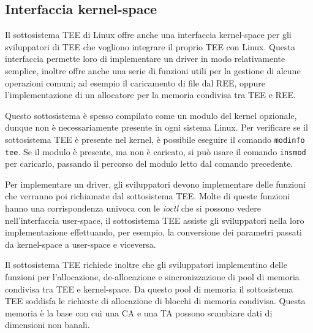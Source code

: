 \documentclass[12pt,italian]{report}
\begin{document}
\subsection{Interfaccia kernel-space}
\label{sec:interfaccia-kernel-space}
Il sottosistema TEE di Linux offre anche una interfaccia kernel-space per
gli sviluppatori di TEE che vogliono integrare il proprio TEE con Linux.
Questa interfaccia permette loro di implementare un driver in modo
relativamente semplice, inoltre offre anche una serie di funzioni
utili per la gestione di alcune operazioni comuni; ad esempio il caricamento
di file dal REE, oppure l'implementazione di un allocatore per la memoria
condivisa tra TEE e REE.

Questo sottosistema è spesso compilato come un modulo del kernel opzionale,
dunque non è necessariamente presente in ogni sistema Linux.
Per verificare se il sottosistema TEE è presente nel kernel, è possibile
eseguire il comando \texttt{modinfo tee}.
Se il modulo è presente, ma non è caricato, si può usare il comando
\texttt{insmod} per caricarlo, passando il percorso del modulo letto
dal comando precedente.

\bigbreak \noindent

Per implementare un driver, gli sviluppatori devono implementare
delle funzioni che verranno poi richiamate dal sottosistema TEE.
Molte di queste funzioni hanno una corrispondenza univoca con le
\textit{ioctl} che si possono vedere nell'interfaccia user-space,
il sottosistema TEE assiste gli sviluppatori nella loro
implementazione effettuando, per esempio, la conversione dei parametri
passati da kernel-space a user-space e viceversa.

Il sottosistema TEE richiede inoltre che gli sviluppatori
implementino delle funzioni per l'allocazione, de-allocazione e
sincronizzazione di pool di memoria condivisa tra TEE e kernel-space.
Da questo pool di memoria il sottosistema TEE soddisfa le richieste
di allocazione di blocchi di memoria condivisa.
Questa memoria è la base con cui una CA e una TA possono scambiare
dati di dimensioni non banali.
\end{document}
